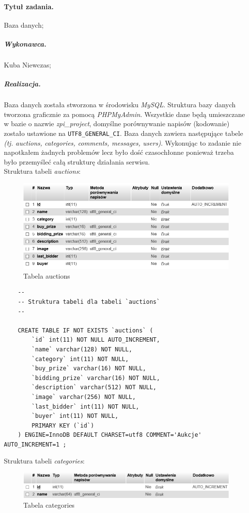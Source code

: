 \documentclass[a4paper]{article}
\begin{document}
	\paragraph{Tytuł zadania.} Baza danych;
	\subparagraph{Wykonawca.} Kuba Niewczas;
	\subparagraph{Realizacja.} Baza danych została stworzona w środowisku \emph{MySQL}. Struktura bazy danych tworzona graficznie za pomocą \emph{PHPMyAdmin}. Wszystkie dane będą umieszczane w bazie o nazwie \emph{zpi\_project}, domyślne porównywanie napisów (kodowanie) zostało ustawione na \verb|UTF8_GENERAL_CI|. Baza danych zawiera następujące tabele \emph{(tj. auctions, categories, comments, messages, users)}. Wykonując to zadanie nie napotkałem żadnych problemów lecz było dość czasochłonne ponieważ trzeba było przemyśleć całą strukturę działania serwisu.\\
	
	Struktura tabeli \emph{auctions}:
	
	\begin{figure}[h]
		\centering
		\includegraphics[width=12cm]{images/auctions.jpg}
		\caption{Tabela auctions}
	\end{figure}
	
	\begin{verbatim}
	--
	-- Struktura tabeli dla tabeli `auctions`
	--
	
	CREATE TABLE IF NOT EXISTS `auctions` (
		`id` int(11) NOT NULL AUTO_INCREMENT,
		`name` varchar(128) NOT NULL,
		`category` int(11) NOT NULL,
		`buy_prize` varchar(16) NOT NULL,
		`bidding_prize` varchar(16) NOT NULL,
		`description` varchar(512) NOT NULL,
		`image` varchar(256) NOT NULL,
		`last_bidder` int(11) NOT NULL,
		`buyer` int(11) NOT NULL,
		PRIMARY KEY (`id`)
	) ENGINE=InnoDB DEFAULT CHARSET=utf8 COMMENT='Aukcje' AUTO_INCREMENT=1 ;
	\end{verbatim}
	
	Struktura tabeli \emph{categories}:
	
	\begin{figure}[h]
		\centering
		\includegraphics[width=12cm]{images/categories.jpg}
		\caption{Tabela categories}
	\end{figure}
	
\end{document}

